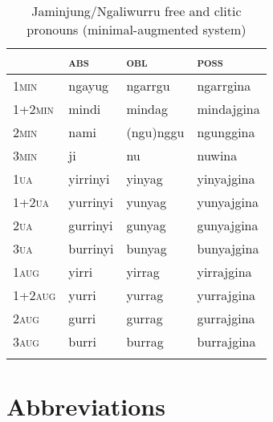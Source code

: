 \documentclass[output=paper,colorlinks,citecolor=brown]{langscibook}
\begin{document}
\begin{table}
\caption{Jaminjung/Ngaliwurru free and clitic pronouns (minimal-augmented system)}
\label{tab:pronouns}
 \begin{tabularx}{\textwidth}{XXXX} 
  \lsptoprule
            & \textsc{abs} & \textsc{obl} & \textsc{poss}\\ 
  \midrule
\textsc{1min}	&	ngayug	&	ngarrgu &	ngarrgina \\ 
\textsc{1+2min}&	mindi	&	mindag	&	mindajgina \\ 
\textsc{2min}	&	nami	&	(ngu)nggu	&	ngunggina \\ 
\textsc{3min}	&	ji	&	nu	&	nuwina \\ 
\textsc{1ua}	&	yirrinyi	&	yinyag	&	yinyajgina \\ 
\textsc{1+2ua} &	yurrinyi	&	yunyag	&	yunyajgina \\ 
\textsc{2ua}	&	gurrinyi	&	gunyag	&	gunyajgina \\ 
\textsc{3ua}	&	burrinyi	&	bunyag	&	bunyajgina \\ 
\textsc{1aug}	&	yirri	&	yirrag	&	yirrajgina \\ 
\textsc{1+2aug}	&	yurri	&	yurrag	&	yurrajgina \\ 
\textsc{2aug}	&	gurri	&	gurrag	&	gurrajgina \\ 
\textsc{3aug}	&	burri	&	burrag	&	burrajgina \\ 
  \lspbottomrule
 \end{tabularx}
\end{table}


\section*{Abbreviations}
\end{document}
